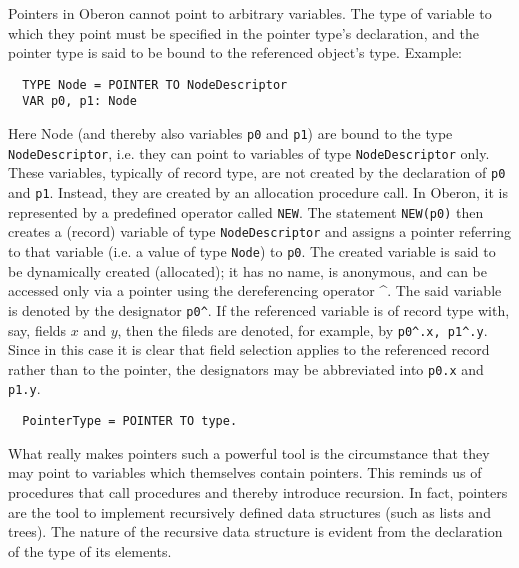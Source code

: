 Pointers in Oberon cannot point to arbitrary variables. The type of variable to which they
point must be specified in the pointer type's declaration, and the pointer type is said to
be bound to the referenced object's type. Example:
\begin{verbatim}
  TYPE Node = POINTER TO NodeDescriptor
  VAR p0, p1: Node
\end{verbatim}
Here Node (and thereby also variables \verb|p0| and \verb|p1|) are bound to the type
\verb|NodeDescriptor|, i.e. they can point to variables of type \verb|NodeDescriptor| only.
These variables, typically of record type, are not created by the declaration of \verb|p0|
and \verb|p1|. Instead, they are created by an allocation procedure call. In Oberon, it is
represented by a predefined operator called \verb|NEW|. The statement \verb|NEW(p0)| then
creates a (record) variable of type \verb|NodeDescriptor| and assigns a pointer referring
to that variable (i.e. a value of type \verb|Node|) to \verb|p0|. The created variable is
said to be dynamically created (allocated); it has no name, is anonymous, and can be accessed
only via a pointer using the dereferencing operator \^{}. The said variable is denoted by
the designator \verb|p0^|. If the referenced variable is of record type with, say, fields
$x$ and $y$, then the fileds are denoted, for example, by \verb|p0^.x, p1^.y|.  Since in
this case it is clear that field selection applies to the referenced record rather than to
the pointer, the designators may be abbreviated into \verb|p0.x| and \verb|p1.y|.
\begin{verbatim}
  PointerType = POINTER TO type.
\end{verbatim}
What really makes pointers such a powerful tool is the circumstance that they may point to
variables which themselves contain pointers. This reminds us of procedures that call procedures
and thereby introduce recursion. In fact, pointers are the tool to implement recursively
defined data structures (such as lists and trees). The nature of the recursive data structure
is evident from the declaration of the type of its elements.

